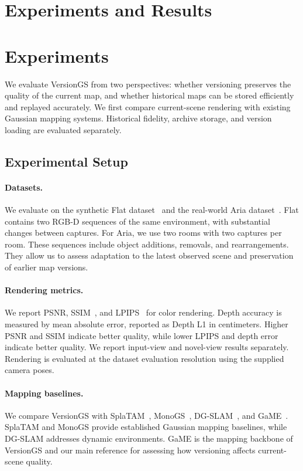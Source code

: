 \section{Experiments and Results}
\section{Experiments}
\label{sec:experiments}

We evaluate VersionGS from two perspectives:
whether versioning preserves the quality of the current map,
and whether historical maps can be stored efficiently and replayed
accurately.
We first compare current-scene rendering with existing Gaussian
mapping systems.
Historical fidelity, archive storage, and version loading are
evaluated separately.

\subsection{Experimental Setup}
\label{sec:experimental_setup}

\paragraph{Datasets.}
We evaluate on the synthetic Flat
dataset~\cite{schmid2022panoptic}
and the real-world Aria
dataset~\cite{pan2023ariadigitaltwinnew}.
Flat contains two RGB-D sequences of the same environment,
with substantial changes between captures.
For Aria, we use two rooms with two captures per room.
These sequences include object additions, removals, and rearrangements.
They allow us to assess adaptation to the latest observed scene
and preservation of earlier map versions.

\paragraph{Rendering metrics.}
We report PSNR, SSIM~\cite{wang2004image},
and LPIPS~\cite{zhang2018unreasonable}
for color rendering.
Depth accuracy is measured by mean absolute error,
reported as Depth L1 in centimeters.
Higher PSNR and SSIM indicate better quality,
while lower LPIPS and depth error indicate better quality.
We report input-view and novel-view results separately.
Rendering is evaluated at the dataset evaluation resolution
using the supplied camera poses.

\paragraph{Mapping baselines.}
We compare VersionGS with
SplaTAM~\cite{keetha2024splatam},
MonoGS~\cite{murai2024monogs},
DG-SLAM~\cite{xu2024dgslam},
and GaME~\cite{yugay2026game}.
SplaTAM and MonoGS provide established Gaussian mapping baselines,
while DG-SLAM addresses dynamic environments.
GaME is the mapping backbone of VersionGS and our main reference
for assessing how versioning affects current-scene quality.

